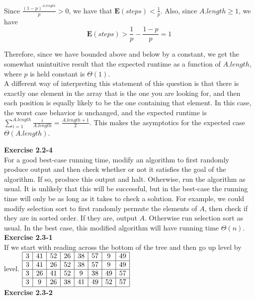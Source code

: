 \documentclass{article}
\begin{document}
Since $\frac{(1-p)^{A.length}}{p}>0$, we have that $\mathbf{E}(steps) < \frac{1}{p}$. Also, since $A.length\ge1$, we have 
\[
\mathbf{E}(steps) > \frac{1}{p} - \frac{1-p}{p} = 1
\]

Therefore, since we have bounded above and below by a constant, we get the somewhat unintuitive result that the expected runtime as a function of $A.length$, where $p$ is held constant is $\Theta(1)$.\\

A different way of interpreting this statement of this question is that there is exactly one element in the array that is the one you are looking for, and then each position is equally likely to be the one containing that element. In this case, the worst case behavior is unchanged, and the expected runtime is $\sum_{i=1}^{A.length} \frac{i}{A.length} = \frac{A.length+1}{2}$. This makes the asymptotics for the expected case $\Theta(A.length)$. 


\noindent\textbf{Exercise 2.2-4}\\

For a good best-case running time, modify an algorithm to first randomly produce output and then check whether or not it satisfies the goal of the algorithm.  If so, produce this output and halt.  Otherwise, run the algorithm as usual.  It is unlikely that this will be successful, but in the best-case the running time will only be as long as it takes to check a solution.  For example, we could modify selection sort to first randomly permute the elements of $A$, then check if they are in sorted order.  If they are, output $A$.  Otherwise run selection sort as usual.  In the best case, this modified algorithm will have running time $\Theta(n)$. \\

\noindent\textbf{Exercise 2.3-1}\\

If we start with reading across the bottom of the tree and then go up level by level.
$
\begin{array}{|c|c|c|c|c|c|c|c|}
\hline
3&41&52&26&38&57&9&49\\
\hline
3&41&26&52&38&57&9&49\\
\hline
3&26&41&52&9&38&49&57\\
\hline
3&9&26&38&41&49&52&57\\
\hline
\end{array}
$\\

\noindent\textbf{Exercise 2.3-2}\\
\end{document}
